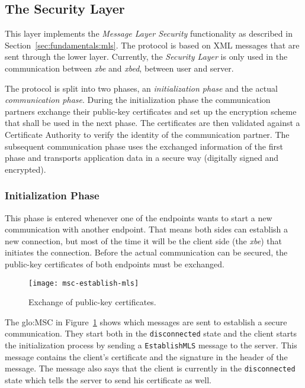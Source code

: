 \subsection{The Security Layer}
\label{sec:protocol:security}

This layer  implements the \emph{Message Layer  Security} functionality as
described in Section~\ref{sec:fundamentals:mls}.  The protocol is based on
XML  messages that  are  sent  through the  lower  layer.  Currently,  the
\emph{Security Layer} is only used in the communication between \emph{xbe}
and \emph{xbed}, \ie between user and server.

The protocol is split into  two phases, an \emph{initialization phase} and
the actual \emph{communication phase}. During the initialization phase the
communication partners  exchange their public-key certificates  and set up
the  encryption  scheme  that  shall  be  used in  the  next  phase.   The
certificates are then validated  against a Certificate Authority to verify
the identity  of the  communication partner. The  subsequent communication
phase uses  the exchanged  information of the  first phase  and transports
application data in a secure way (\ie digitally signed and encrypted).

\subsubsection{Initialization Phase}

This phase is  entered whenever one of the endpoints wants  to start a new
communication with another endpoint. That means both sides can establish a
new connection, but most  of the time it will be the  client side (\eg the
\emph{xbe}) that initiates the connection. Before the actual communication
can  be secured,  the public-key  certificates of  both endpoints  must be
exchanged.

\begin{figure}[ht]
  \centering
  \texttt{[image: msc-establish-mls]}
  \caption[MSC    Message   Layer    Security]{Exchange    of   public-key
    certificates.}
  \label{fig:msc-establish-mls}
\end{figure}

The   \gls{glo:MSC}  in  Figure~\ref{fig:msc-establish-mls}   shows  which
messages are sent to establish  a secure communication. They start both in
the \texttt{disconnected}  state and the client  starts the initialization
process  by sending a  \texttt{EstablishMLS} message  to the  server. This
message contains the client's certificate  and the signature in the header
of the message.  The message also says that the client is currently in the
\texttt{disconnected} state which tells the server to send his certificate
as well.

